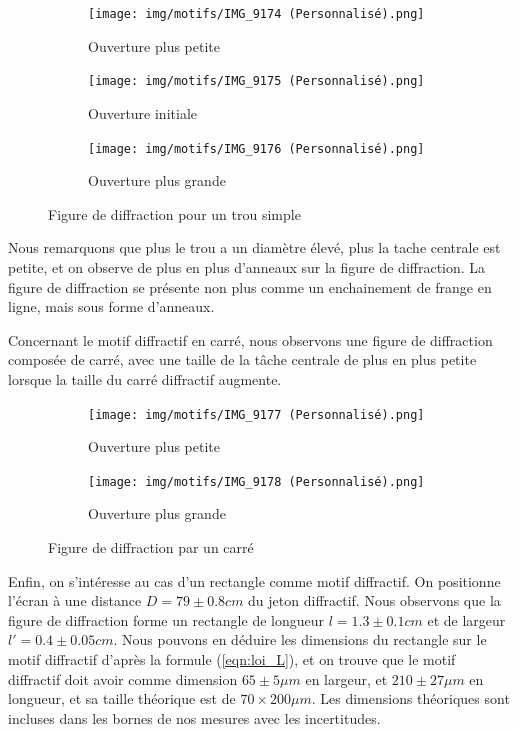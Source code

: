\documentclass[12pt]{article}
\begin{document}
\begin{figure}[h!]
    \centering
    \begin{subfigure}{.33\textwidth}
      \centering
        \texttt{[image: img/motifs/IMG\_9174 (Personnalisé).png]}
      \caption{Ouverture plus petite}
    \end{subfigure}%
    \begin{subfigure}{.33\textwidth}
      \centering
      \texttt{[image: img/motifs/IMG\_9175 (Personnalisé).png]}
      \caption{Ouverture initiale}
    \end{subfigure}
    \begin{subfigure}{.33\textwidth}
        \centering
        \texttt{[image: img/motifs/IMG\_9176 (Personnalisé).png]}
        \caption{Ouverture plus grande}
    \end{subfigure}
    \caption{Figure de diffraction pour un trou simple}
    \label{fig:fig_trou_simple}
\end{figure}

Nous remarquons que plus le trou a un diamètre élevé, plus la tache centrale est petite, et on observe de plus en plus d'anneaux sur la figure de diffraction. La figure de diffraction
se présente non plus comme un enchainement de frange en ligne, mais sous forme d'anneaux.

Concernant le motif diffractif en carré, nous observons une figure de diffraction composée de carré, avec une taille de la tâche centrale de plus en plus petite lorsque la taille du carré diffractif augmente.

\begin{figure}[h!]
    \centering
    \begin{subfigure}{.5\textwidth}
      \centering
        \texttt{[image: img/motifs/IMG\_9177 (Personnalisé).png]}
      \caption{Ouverture plus petite}
    \end{subfigure}%
    \begin{subfigure}{.5\textwidth}
      \centering
      \texttt{[image: img/motifs/IMG\_9178 (Personnalisé).png]}
      \caption{Ouverture plus grande}
    \end{subfigure}
    \caption{Figure de diffraction par un carré}
    \label{fig:fig_carre}
\end{figure}

Enfin, on s'intéresse au cas d'un rectangle comme motif diffractif. On positionne l'écran à une distance $D = 79 \pm 0.8cm$ du jeton diffractif. Nous observons que la figure de diffraction forme un rectangle
de longueur $l = 1.3 \pm 0.1cm$ et de largeur $l' = 0.4 \pm 0.05cm$. Nous pouvons en déduire les dimensions du rectangle sur le motif diffractif d'après la formule (\ref{eqn:loi_L}), et on trouve que le motif diffractif doit avoir 
comme dimension $65 \pm 5 \mu m$ en largeur, et $210 \pm 27 \mu m$ en longueur, et sa taille théorique est de $70\times200 \mu m$. Les dimensions théoriques sont incluses dans les bornes de nos mesures avec les incertitudes.  
\break
\end{document}
